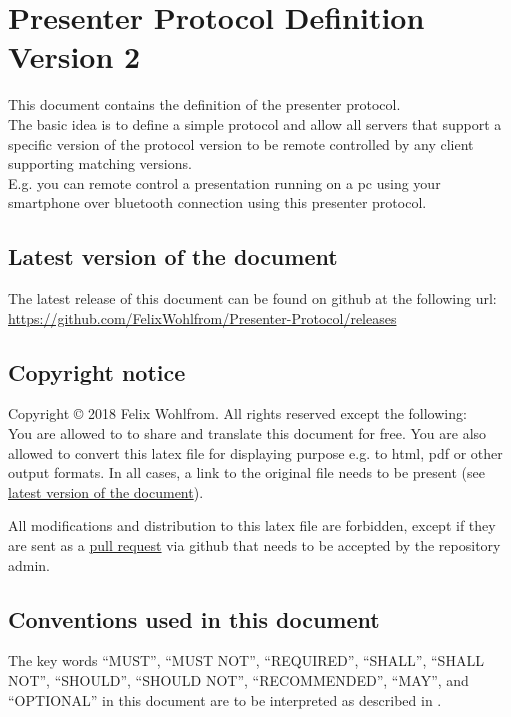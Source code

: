 \documentclass{article}
\begin{document}
\section*{Presenter Protocol Definition Version 2}

This document contains the definition of the presenter protocol.\\
The basic idea is to define a simple protocol and allow all servers that support a specific version of the protocol version to be remote controlled by any client supporting matching versions.\\
E.g. you can remote control a presentation running on a pc using your smartphone over bluetooth connection using this presenter protocol.

\tableofcontents

\subsection{Latest version of the document}
\label{latest_version}

The latest release of this document can be found on github at the following url: \url{https://github.com/FelixWohlfrom/Presenter-Protocol/releases}

\subsection{Copyright notice}

Copyright © 2018 Felix Wohlfrom. All rights reserved except the following:\\
You are allowed to to share and translate this document for free. You are also allowed to convert this latex file for displaying purpose e.g. to html, pdf or other output formats. In all cases, a link to the original file needs to be present (see \hyperref[latest_version]{latest version of the document}).

All modifications and distribution to this latex file are forbidden, except if they are sent as a \href{https://github.com/FelixWohlfrom/Presenter-Protocol/pulls}{pull request} via github that needs to be accepted by the repository admin.

\subsection{Conventions used in this document}

The key words ``MUST'', ``MUST NOT'', ``REQUIRED'', ``SHALL'', ``SHALL NOT'', ``SHOULD'', ``SHOULD NOT'', ``RECOMMENDED'', ``MAY'', and ``OPTIONAL'' in this document are to be interpreted as described in \cite{RFC2119}.
\end{document}
